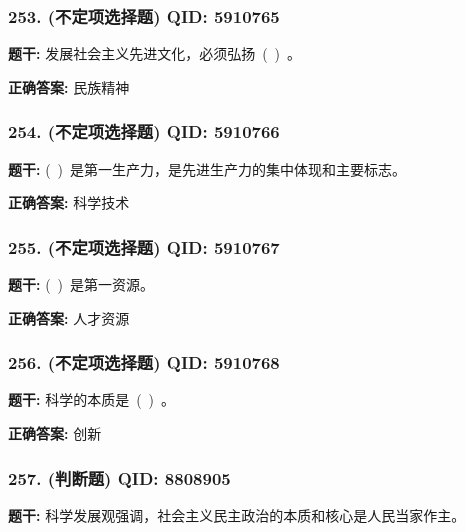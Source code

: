 \documentclass[12pt,UTF8]{ctexart}
\begin{document}
\subsubsection*{253. (不定项选择题) \small QID: 5910765}

\textbf{题干:}
发展社会主义先进文化，必须弘扬 ( ) 。

\textbf{正确答案:}
民族精神

\vspace{0.3em}\hrulefill\vspace{0.7em}

\subsubsection*{254. (不定项选择题) \small QID: 5910766}

\textbf{题干:}
( ) 是第一生产力，是先进生产力的集中体现和主要标志。

\textbf{正确答案:}
科学技术

\vspace{0.3em}\hrulefill\vspace{0.7em}

\subsubsection*{255. (不定项选择题) \small QID: 5910767}

\textbf{题干:}
( ) 是第一资源。

\textbf{正确答案:}
人才资源

\vspace{0.3em}\hrulefill\vspace{0.7em}

\subsubsection*{256. (不定项选择题) \small QID: 5910768}

\textbf{题干:}
科学的本质是 ( ) 。

\textbf{正确答案:}
创新

\vspace{0.3em}\hrulefill\vspace{0.7em}

\subsubsection*{257. (判断题) \small QID: 8808905}

\textbf{题干:}
科学发展观强调，社会主义民主政治的本质和核心是人民当家作主。
\end{document}
